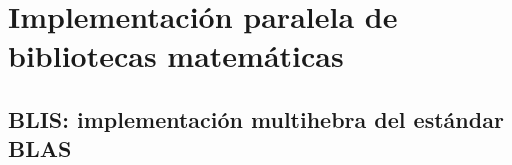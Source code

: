 %




\section{Implementación paralela de bibliotecas matemáticas}
\label{sec:bibliotecas}

\subsection{BLIS: implementación multihebra del estándar BLAS}

